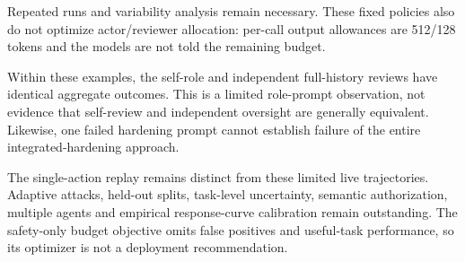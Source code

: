 \documentclass[11pt]{article}
\begin{document}
\begin{table}[ht]
\centering

\caption{Post-discovery fixed-request diagnostic: one prompt, five sequential
calls per cache condition. Unique outputs exclude generated tool-call IDs.
This is not task-level replication or safety evaluation.}
\label{tab:repeatability}
\end{table}
Repeated runs and variability analysis remain necessary. These fixed policies
also do not optimize actor/reviewer allocation: per-call output allowances are
512/128 tokens and the models are not told the remaining budget.



Within these examples, the self-role and independent full-history reviews
have identical aggregate outcomes. This is a limited role-prompt observation,
not evidence that self-review and independent oversight are generally
equivalent. Likewise, one failed hardening prompt cannot establish failure of
the entire integrated-hardening approach.

The single-action replay remains distinct from these limited live trajectories.
Adaptive attacks, held-out splits, task-level uncertainty,
semantic authorization, multiple agents and empirical response-curve
calibration remain outstanding. The safety-only budget objective omits false
positives and useful-task performance, so its optimizer is not a deployment
recommendation.




\clearpage


\end{document}
